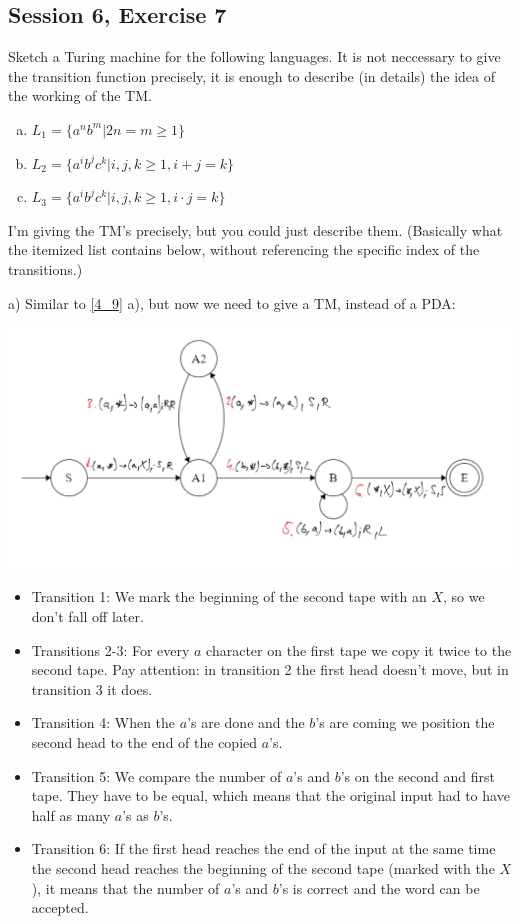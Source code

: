\subsection {Session 6, Exercise 7}


Sketch a Turing machine for the following languages. It is not neccessary to give the transition function precisely, it is enough to describe (in details) the idea of the working of the TM.

\begin{enumerate}[a)]
    \item $L_1 = \{a^nb^m | 2n = m \geq{} 1\}$
    \item $L_2 = \{a^ib^jc^k | i,j,k \geq{} 1, i+j = k\}$
    \item $L_3 = \{a^ib^jc^k | i,j,k \geq{} 1, i \cdot j = k\}$
\end{enumerate}


I'm giving the TM's precisely, but you could just describe them. (Basically what the itemized list contains below, without referencing the specific index of the transitions.)

a) Similar to \ref{4_9} a), but now we need to give a TM, instead of a PDA:

\includegraphics[width=\linewidth]{06/6_7_canvas.png}

\begin{itemize}
    \item Transition 1: We mark the beginning of the second tape with an $X$, so we don't fall off later.
    \item Transitions 2-3: For every $a$ character on the first tape we copy it twice to the second tape. Pay attention: in transition 2 the first head doesn't move, but in transition 3 it does.
    \item Transition 4: When the $a$'s are done and the $b$'s are coming we position the second head to the end of the copied $a$'s.
    \item Transition 5: We compare the number of $a$'s and $b$'s on the second and first tape. They have to be equal, which means that the original input had to have half as many $a$'s as $b$'s.
    \item Transition 6: If the first head reaches the end of the input at the same time the second head reaches the beginning of the second tape (marked with the $X$), it means that the number of $a$'s and $b$'s is correct and the word can be accepted.
\end{itemize}

